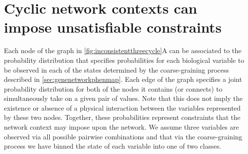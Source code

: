 \section{Cyclic network contexts can impose unsatisfiable constraints}\label{sec:cycliccontextunsatisfiableconstraints}


Each node of the \SH{} graph in \autoref{fig:inconsistentthreecycle}A can be associated to the probability distribution that specifies probabilities for each biological variable to be observed in each of the states determined by the coarse-graining process described in \autoref{sec:genenetworkphenmap}. Each edge of the graph specifies a joint probability distribution for both of the nodes it contains (or connects) to simultaneously take on a given pair of values. Note that this does not imply the existence or absence of a physical interaction between the variables represented by these two nodes. Together, these probabilities represent constraints that the network context may impose upon the network.
We assume three variables are observed via all possible pairwise combinations and that via the coarse-graining process we have binned the state of each variable into one of two classes.
